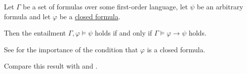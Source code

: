 \begin{theorem}\label{thm:first_order_semantic_deduction_theorem}
  Let \( \Gamma \) be a set of formulas over some first-order language, let \( \psi \) be an arbitrary formula and let \( \varphi \) be a \hyperref[def:first_order_syntax/ground_formula]{closed formula}.

  Then the entailment \( \Gamma, \varphi \vDash \psi \) holds if and only if \( \Gamma \vDash \varphi \to \psi \) holds.

  See  for the importance of the condition that \( \varphi \) is a closed formula.

  Compare this result with  and .
\end{theorem}
